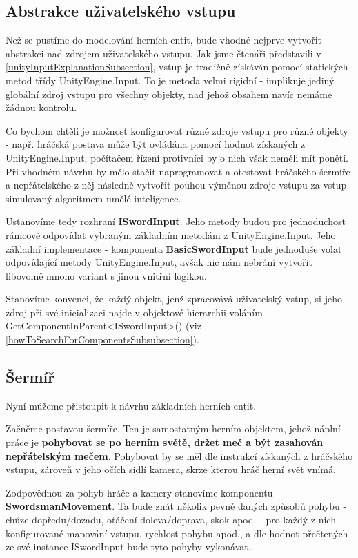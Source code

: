 \subsection{Abstrakce uživatelského vstupu}

Než se pustíme do modelování herních entit, bude vhodné nejprve vytvořit abstrakci nad zdrojem uživatelského vstupu. Jak jsme čtenáři představili v \ref{unityInputExplanationSubsection}, vstup je tradičně získáván pomocí statických metod třídy UnityEngine.Input. To je metoda velmi rigidní - implikuje jediný globální zdroj vstupu pro všechny objekty, nad jehož obsahem navíc nemáme žádnou kontrolu. 

Co bychom chtěli je možnost konfigurovat různé zdroje vstupu pro různé objekty - např. hráčská postava může být ovládána pomocí hodnot získaných z UnityEngine.Input, počítačem řízení protivníci by o nich však neměli mít ponětí. Při vhodném návrhu by mělo stačit naprogramovat a otestovat hráčského šermíře a nepřátelského z něj následně vytvořit pouhou výměnou zdroje vstupu za vstup simulovaný algoritmem umělé inteligence.

Ustanovíme tedy rozhraní \textbf{ISwordInput}. Jeho metody budou pro jednoduchost rámcově odpovídat vybraným základním metodám z UnityEngine.Input. Jeho základní implementace - komponenta \textbf{BasicSwordInput} bude jednoduše volat odpovídající metody UnityEngine.Input, avšak nic nám nebrání vytvořit libovolně mnoho variant s jinou vnitřní logikou. 

Stanovíme konvenci, že každý objekt, jenž zpracovává uživatelský vstup, si jeho zdroj při své inicializaci najde v objektové hierarchii voláním GetComponentInParent<ISwordInput>() (viz \ref{howToSearchForComponentsSubsubsection}).


\subsection{Šermíř}

Nyní můžeme přistoupit k návrhu základních herních entit. 

Začněme postavou šermíře. Ten je samostatným herním objektem, jehož náplní práce je \textbf{pohybovat se po herním světě, držet meč a být zasahován nepřátelským mečem}. Pohybovat by se měl dle instrukcí získaných z hráčského vstupu, zároveň v jeho očích sídlí kamera, skrze kterou hráč herní svět vnímá.

Zodpovědnou za pohyb hráče a kamery stanovíme komponentu \textbf{SwordsmanMovement}. Ta bude znát několik pevně daných způsobů pohybu - chůze dopředu/dozadu, otáčení doleva/doprava, skok apod. - pro každý z nich konfigurované mapování vstupu, rychlost pohybu apod., a dle hodnot přečtených ze své instance ISwordInput bude tyto pohyby vykonávat. 


